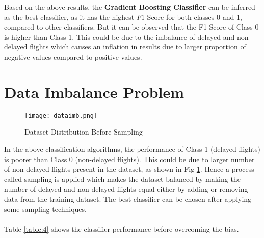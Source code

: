 \documentclass[12pt,letter-paper]{article}
\begin{document}
    Based on the above results, the {\bfseries Gradient Boosting Classifier} can be inferred as the best classifier, as it has the highest $F1$-Score for both classes 0 and 1, compared to other classifiers. But it can be observed that the F1-Score of Class 0 is higher than Class 1. This could be due to the imbalance of delayed and non-delayed flights which causes an inflation in results due to larger proportion of negative values compared to positive values.
    
    
\section{Data Imbalance Problem}        

    \begin{figure}[H]%
        \begin{center}
          \texttt{[image: dataimb.png]}%
            \caption{Dataset Distribution Before Sampling} 
            \label{fig:1}
        \end{center}
    \end{figure}
    
    In the above classification algorithms, the performance of Class 1 (delayed flights) is poorer than Class 0 (non-delayed flights). This could be due to larger number of non-delayed flights present in the dataset, as shown in Fig \ref{fig:1}. Hence a process called sampling is applied which makes the dataset balanced by making the number of delayed and non-delayed flights equal either by adding or removing data from the training dataset. The best classifier can be chosen after applying some sampling techniques.
    
    \paragraph{}
    Table \ref{table:4} shows the classifier performance before overcoming the bias.
    
\end{document}
